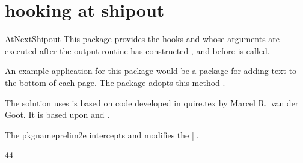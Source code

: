 \section{hooking at shipout}

\begin{macro}{\EveryShipout}
\begin{macro}{AtNextShipout}
This package provides the hooks  and 
   whose arguments are executed after the output 
  routine has constructed , and before  is 
  called.
\end{macro}
\end{macro}

An example application for this package would be a package for
 adding text to the bottom of each page.
 The   package adopts this method \citep{prelim2e}.

The solution  uses is based on code developed in  \textsf{quire.tex} by
 Marcel R.~van der Goot.  It is based upon  and .

The pkgname{prelim2e}  intercepts and modifies the ||. 

\begin{teX}
44 \newcommand{\@Prelim@EveryShipout}{%
45 \bgroup
First we save the dimensions of \box255: height, width and depth; and calculate
the total height of \box255.
46 \dimen\z@=\wd\@cclv
47 \dimen\@ne=\ht\@cclv
48 \dimen\tw@=\dp\@cclv
49 \dimen\thr@@=\dimen1
50 \advance\dimen\thr@@ by \dimen\tw@
Then we set \box255: A \vbox to the total height of \box255. In this a \hbox to
the width of \box255 is included, in which \box255 is set.
51 \global\setbox\@cclv\vbox to \dimen\thr@@{%
52 \hb@xt@\dimen\z@{%
53 \box\@cclv%
54 \hss
55 }%
\end{teX}
To this we append the text produced by |\PrelimText|. It is put in a |\vbox to 0pt|
in which a |\hbox| to the width of |\box255| is included, in which |\PrelimText| is set.
We have to reset |\protect| because it is set to |\noexpand| by the output routine.

\begin{teX}
56 \vbox to \z@{%
57 \hb@xt@\dimen\z@{%
58 \let\protect\relax
59 \hfill\PrelimText\hfill
60 }%
61 \vss
62 }%
63 \vss
64 }%
\end{teX}

Finally we set the dimensions of |\box255| to the values they had before |\@Prelim@EveryShipout|.

\begin{teX}
65 \wd\@cclv=\dimen\z@
66 \ht\@cclv=\dimen\@ne
67 \dp\@cclv=\dimen\tw@
68 \egroup
69}
\end{teX}

